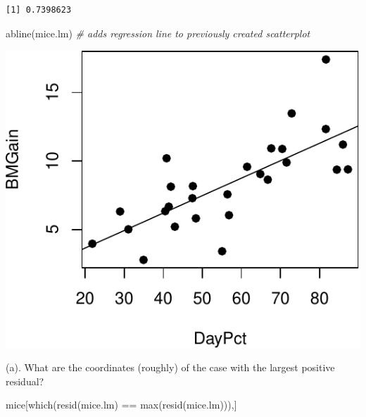 \documentclass[
]{book}
\newenvironment{Shaded}{\begin{snugshade}}{\end{snugshade}}
\newcommand{\CommentTok}[1]{\textcolor[rgb]{0.56,0.35,0.01}{\textit{#1}}}
\newcommand{\FunctionTok}[1]{\textcolor[rgb]{0.00,0.00,0.00}{#1}}
\newcommand{\NormalTok}[1]{#1}
\newcommand{\SpecialCharTok}[1]{\textcolor[rgb]{0.00,0.00,0.00}{#1}}
\begin{document}
\begin{Shaded}
\end{Shaded}

\begin{verbatim}
[1] 0.7398623
\end{verbatim}

\begin{Shaded}
\begin{Highlighting}[]
\FunctionTok{abline}\NormalTok{(mice.lm) }\CommentTok{\# adds regression line to previously created scatterplot}
\end{Highlighting}
\end{Shaded}

\includegraphics[width=1\linewidth]{Class_Activity_6_files/figure-latex/unnamed-chunk-22-1}

(a). What are the coordinates (roughly) of the case with the largest positive residual?

\begin{Shaded}
\begin{Highlighting}[]
\NormalTok{mice[}\FunctionTok{which}\NormalTok{(}\FunctionTok{resid}\NormalTok{(mice.lm) }\SpecialCharTok{==} \FunctionTok{max}\NormalTok{(}\FunctionTok{resid}\NormalTok{(mice.lm))),]}
\end{Highlighting}
\end{Shaded}
\end{document}
